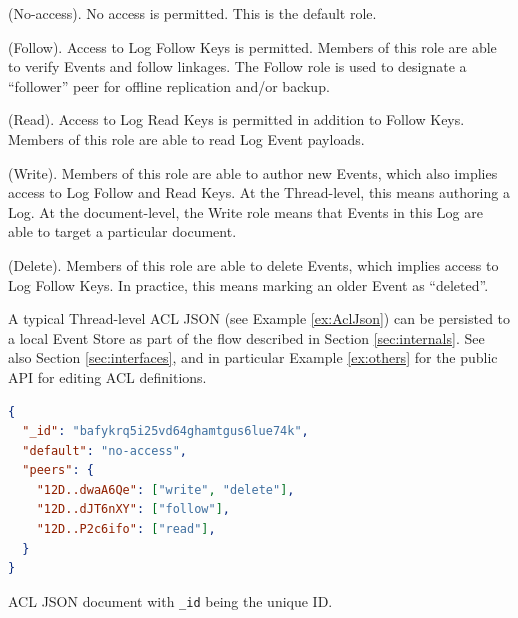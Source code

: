 \documentclass{textile}
\begin{document}
\begin{definition}
  (No-access). No access is permitted. This is the default role.
\end{definition}

\begin{definition}
  (Follow). Access to Log Follow Keys is permitted. Members of this role are able to verify Events and follow linkages. The Follow role is used to designate a ``follower'' peer for offline replication and/or backup.
\end{definition}

\begin{definition}
  (Read). Access to Log Read Keys is permitted in addition to Follow Keys. Members of this role are able to read Log Event payloads.
\end{definition}

\begin{definition}
  (Write). Members of this role are able to author new Events, which also implies access to Log Follow and Read Keys. At the Thread-level, this means authoring a Log. At the document-level, the Write role means that Events in this Log are able to target a particular document.
\end{definition}

\begin{definition}
  (Delete). Members of this role are able to delete Events, which implies access to Log Follow Keys. In practice, this means marking an older Event as ``deleted''.
\end{definition}

A typical Thread-level ACL JSON (see Example \ref{ex:AclJson}) can be persisted to a local Event Store as part of the flow described in Section \ref{sec:internals}. See also Section \ref{sec:interfaces}, and in particular Example \ref{ex:others} for the public API for editing ACL definitions.

\begin{example}
  \begin{minipage}{.45\textwidth}
    \begin{lstlisting}[language=json,firstnumber=1]
{
  "_id": "bafykrq5i25vd64ghamtgus6lue74k",
  "default": "no-access",
  "peers": {
    "12D..dwaA6Qe": ["write", "delete"],
    "12D..dJT6nXY": ["follow"],
    "12D..P2c6ifo": ["read"],
  }
}
    \end{lstlisting}
  \caption{ACL JSON document with \texttt{\_id} being the unique ID. }
  \label{ex:AclJson}
  \end{minipage}
\end{example}
\end{document}
